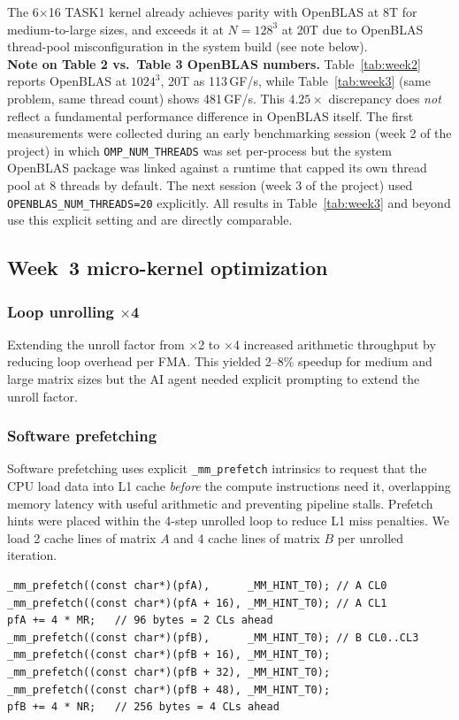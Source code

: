 \documentclass[11pt,a4paper]{article}
\begin{document}
\noindent The 6$\times$16 TASK1 kernel already achieves parity with OpenBLAS at 8T for medium-to-large sizes, and exceeds it at $N=128^3$ at 20T due to OpenBLAS thread-pool misconfiguration in the system build (see note below).\\

\textbf{Note on Table 2 vs.\ Table 3 OpenBLAS numbers.}
Table~\ref{tab:week2} reports OpenBLAS at $1024^3$, 20T as 113\,GF/s, while
Table~\ref{tab:week3} (same problem, same thread count) shows 481\,GF/s.
This $4.25\times$ discrepancy does \emph{not} reflect a fundamental performance
difference in OpenBLAS itself. The first measurements were collected during
an early benchmarking session (week 2 of the project) in which \texttt{OMP\_NUM\_THREADS} was set
per-process but the system OpenBLAS package was linked against a runtime that
capped its own thread pool at 8 threads by default. The next session (week 3 of the project) used
\texttt{OPENBLAS\_NUM\_THREADS=20} explicitly. All results in Table~\ref{tab:week3}
and beyond use this explicit setting and are directly comparable.

\subsection{Week~3 micro-kernel optimization}

\subsubsection{Loop unrolling $\times$4}
Extending the unroll factor from $\times$2 to $\times$4 increased arithmetic throughput by reducing loop overhead per FMA. This yielded 2--8\% speedup for medium and large matrix sizes but the AI agent needed explicit prompting to extend the unroll factor.

\subsubsection{Software prefetching}
Software prefetching uses explicit \texttt{\_mm\_prefetch} intrinsics to request that the CPU load data into L1 cache \emph{before} the compute instructions need it, overlapping memory latency with useful arithmetic and preventing pipeline stalls. Prefetch hints were placed within the 4-step unrolled loop to reduce L1 miss penalties. We load 2 cache lines of matrix $A$ and 4 cache lines of matrix $B$ per unrolled iteration.

\begin{lstlisting}[caption={6$\times$16 prefetch pattern inside the $\times$4 loop}]
_mm_prefetch((const char*)(pfA),      _MM_HINT_T0); // A CL0
_mm_prefetch((const char*)(pfA + 16), _MM_HINT_T0); // A CL1
pfA += 4 * MR;   // 96 bytes = 2 CLs ahead
_mm_prefetch((const char*)(pfB),      _MM_HINT_T0); // B CL0..CL3
_mm_prefetch((const char*)(pfB + 16), _MM_HINT_T0);
_mm_prefetch((const char*)(pfB + 32), _MM_HINT_T0);
_mm_prefetch((const char*)(pfB + 48), _MM_HINT_T0);
pfB += 4 * NR;   // 256 bytes = 4 CLs ahead
\end{lstlisting}
\end{document}
